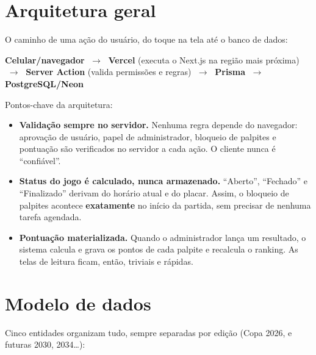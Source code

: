 \documentclass[11pt,a4paper]{article}
\begin{document}
\section{Arquitetura geral}

O caminho de uma ação do usuário, do toque na tela até o banco de dados:

\begin{center}
\colorbox{cinzaclaro}{\begin{minipage}{\dimexpr\linewidth-2\fboxsep}
\centering\vspace{4pt}
\textbf{Celular/navegador} $\;\longrightarrow\;$ \textbf{Vercel} (executa o
Next.js na região mais próxima) $\;\longrightarrow\;$ \textbf{Server Action}
(valida permissões e regras) $\;\longrightarrow\;$ \textbf{Prisma}
$\;\longrightarrow\;$ \textbf{PostgreSQL/Neon}
\vspace{4pt}
\end{minipage}}
\end{center}

\noindent Pontos-chave da arquitetura:

\begin{itemize}
  \item \textbf{Validação sempre no servidor.} Nenhuma regra depende do
  navegador: aprovação de usuário, papel de administrador, bloqueio de
  palpites e pontuação são verificados no servidor a cada ação. O cliente
  nunca é ``confiável''.
  \item \textbf{Status do jogo é calculado, nunca armazenado.} ``Aberto'',
  ``Fechado'' e ``Finalizado'' derivam do horário atual e do placar. Assim, o
  bloqueio de palpites acontece \textbf{exatamente} no início da partida, sem
  precisar de nenhuma tarefa agendada.
  \item \textbf{Pontuação materializada.} Quando o administrador lança um
  resultado, o sistema calcula e grava os pontos de cada palpite e recalcula o
  ranking. As telas de leitura ficam, então, triviais e rápidas.
\end{itemize}

\section{Modelo de dados}

Cinco entidades organizam tudo, sempre separadas por edição (Copa 2026, e
futuras 2030, 2034\ldots):
\end{document}
